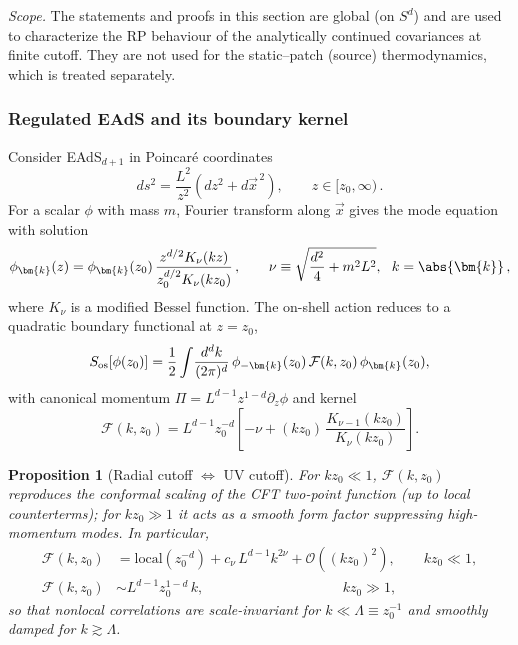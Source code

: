 \documentclass[10pt]{article}
\theoremstyle{definition}
\theoremstyle{plain}
\newtheorem{proposition}{Proposition}[section]
\begin{document}
\noindent\emph{Scope.} The statements and proofs in this section are global (on $S^d$) and are used to
characterize the RP behaviour of the analytically continued covariances at finite cutoff. They are not
used for the static–patch (source) thermodynamics, which is treated separately.


\subsubsection*{Regulated EAdS and its boundary kernel}\label{subsubsec:uom-main-002}

Consider EAdS$_{d+1}$ in Poincar\'e coordinates
\begin{equation}
ds^2 = \frac{L^2}{z^2}\left(dz^2 + d\vec{x}^{\,2}\right),\qquad z\in[z_0,\infty)\,.
\end{equation}
For a scalar $\phi$ with mass $m$, Fourier transform along $\vec{x}$ gives the mode equation with solution
\begin{equation}
\phi_{\bm{k}}(z) = \phi_{\bm{k}}(z_0)\,\frac{z^{d/2}K_\nu(k z)}{z_0^{d/2}K_\nu(k z_0)}\,,\qquad
\nu \equiv \sqrt{\frac{d^2}{4}+m^2L^2},\ \ k=\abs{\bm{k}}\,,
\end{equation}
where $K_\nu$ is a modified Bessel function. The on-shell action reduces to a quadratic boundary functional at $z=z_0$,
\begin{equation}
S_{\rm os}[\phi(z_0)] = \frac{1}{2}\int\!\frac{d^dk}{(2\pi)^d}\,
\phi_{-\bm{k}}(z_0)\, \mathcal{F}(k,z_0)\, \phi_{\bm{k}}(z_0),
\end{equation}
with canonical momentum $\Pi=L^{d-1} z^{1-d}\partial_z \phi$ and kernel
\begin{equation}
\boxed{\quad \mathcal{F}(k,z_0) = L^{d-1} z_0^{-d}\left[-\nu + (kz_0)\,\frac{K_{\nu-1}(kz_0)}{K_\nu(kz_0)}\right].\quad}
\label{eq:kernel}
\end{equation}

\begin{proposition}[Radial cutoff $\Leftrightarrow$ UV cutoff]
\label{prop:cutoff}
For $kz_0\ll 1$, $\mathcal{F}(k,z_0)$ reproduces the conformal scaling of the CFT two-point function (up to local counterterms); for $kz_0\gg 1$ it acts as a smooth form factor suppressing high-momentum modes. In particular,
\begin{align}
\mathcal{F}(k,z_0) &= \text{local}(z_0^{-d}) + c_\nu\, L^{d-1} k^{2\nu} + \mathcal{O}((kz_0)^2), \qquad kz_0\ll 1,\\
\mathcal{F}(k,z_0) &\sim L^{d-1} z_0^{1-d}\, k, \qquad\qquad\qquad\qquad\quad\ \ \ \ kz_0\gg 1,
\end{align}
so that nonlocal correlations are scale-invariant for $k\ll \Lambda\equiv z_0^{-1}$ and smoothly damped for $k\gtrsim \Lambda$.
\end{proposition}
\end{document}
